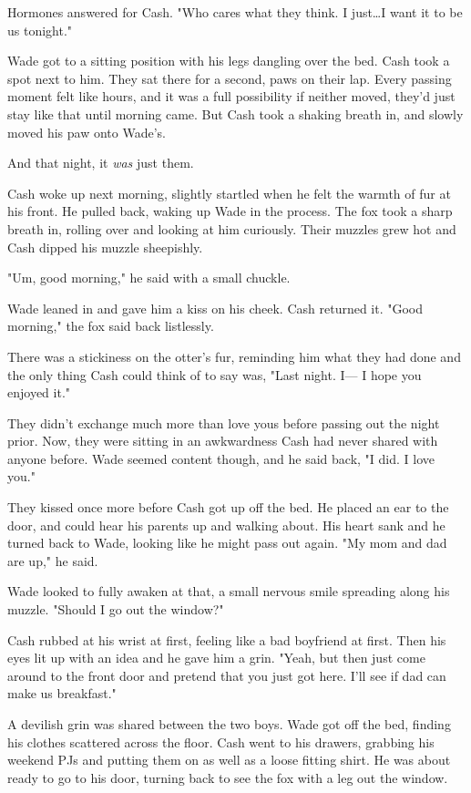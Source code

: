 Hormones answered for Cash. "Who cares what they think. I just\ldots I want it to be us tonight."

Wade got to a sitting position with his legs dangling over the bed. Cash took a spot next to him. They sat there for a second, paws on their lap. Every passing moment felt like hours, and it was a full possibility if neither moved, they'd just stay like that until morning came. But Cash took a shaking breath in, and slowly moved his paw onto Wade's.

And that night, it \emph{was} just them.

Cash woke up next morning, slightly startled when he felt the warmth of fur at his front. He pulled back, waking up Wade in the process. The fox took a sharp breath in, rolling over and looking at him curiously. Their muzzles grew hot and Cash dipped his muzzle sheepishly.

"Um, good morning," he said with a small chuckle.

Wade leaned in and gave him a kiss on his cheek. Cash returned it. "Good morning," the fox said back listlessly.

There was a stickiness on the otter's fur, reminding him what they had done and the only thing Cash could think of to say was, "Last night. I--- I hope you enjoyed it."

They didn't exchange much more than love yous before passing out the night prior. Now, they were sitting in an awkwardness Cash had never shared with anyone before. Wade seemed content though, and he said back, "I did. I love you."

They kissed once more before Cash got up off the bed. He placed an ear to the door, and could hear his parents up and walking about. His heart sank and he turned back to Wade, looking like he might pass out again. "My mom and dad are up," he said.

Wade looked to fully awaken at that, a small nervous smile spreading along his muzzle. "Should I go out the window?"

Cash rubbed at his wrist at first, feeling like a bad boyfriend at first. Then his eyes lit up with an idea and he gave him a grin. "Yeah, but then just come around to the front door and pretend that you just got here. I'll see if dad can make us breakfast."

A devilish grin was shared between the two boys. Wade got off the bed, finding his clothes scattered across the floor. Cash went to his drawers, grabbing his weekend PJs and putting them on as well as a loose fitting shirt. He was about ready to go to his door, turning back to see the fox with a leg out the window.


